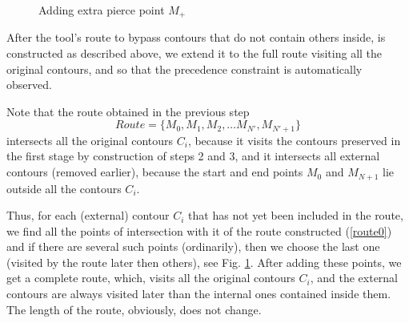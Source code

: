 \documentclass[]{llncs}
\begin{document}
\begin{figure}
  \centering
  \caption{Adding extra pierce point $M_+$}
  \label{extra-pierce-point}
\end{figure}

After the tool’s route
to bypass contours
that do not contain others inside,
is constructed as described above,
we extend it to the full route
visiting all the original contours,
and so that the precedence constraint is
automatically
observed.

Note that the route obtained in the previous step
\begin{equation}
Route = \{ M_0, M_1, M_2, \dots M_{N'}, M_{N'+1}\}
\label{route0}
\end{equation}
intersects all the original contours
$C_i$,
because it visits the contours preserved in the first stage
by construction of steps 2 and 3,
and it intersects all external contours
(removed earlier),
because the start and end points
$M_0$ and
$M_{N + 1}$
lie outside all the contours
$C_i$.

Thus,
for each (external) contour
$C_i$
that has not yet been included in the route,
we find all the points of intersection
with it of the route constructed
(\ref{route0})
and if there are several such points (ordinarily),
then we choose the last one
(visited by the route later then others),
see Fig. \ref{extra-pierce-point}.
After adding these points,
we get a complete route,
which,
visits all the original contours
$C_i$,
and the external contours are always visited later than
the internal ones contained inside them.
The length of the route, obviously, does not change.
\end{document}
